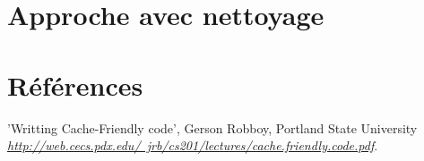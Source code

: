 \documentclass[10pt]{article}
\begin{document}
	\newpage
	\section{Approche avec nettoyage}\label{approche_naive}

	\newpage
	\section{Références}
		\begin{thebibliography}{}
		
				'Writting Cache-Friendly code', Gerson Robboy, Portland State University\newline
				\href{http://web.cecs.pdx.edu/~jrb/cs201/lectures/cache.friendly.code.pdf}
				      {\textit{http://web.cecs.pdx.edu/~jrb/cs201/lectures/cache.friendly.code.pdf}}.
  \end{thebibliography}
\end{document}
